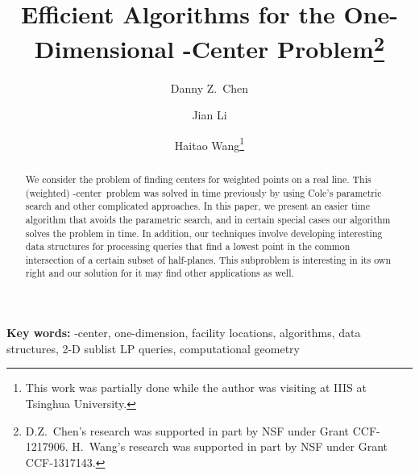 \documentclass{llncs}
\def\cen{-center}
\begin{document}
\title{Efficient Algorithms for the One-Dimensional -Center Problem\thanks{D.Z.~Chen's research was supported in part by NSF
under Grant CCF-1217906. H.~Wang's research was supported in part by NSF under Grant CCF-1317143.}}

\author{Danny Z.~Chen \and Jian Li
\and Haitao Wang\thanks{This work was partially done while the
author was visiting at IIIS at Tsinghua University.}}


\maketitle

\pagestyle{plain}
\setcounter{page}{1}


\begin{abstract}
We consider the problem of finding  centers for  weighted points on a real line.
This (weighted) \cen\ problem was solved in  time previously by using Cole's parametric search and other complicated approaches. In this paper, we present an easier  time algorithm that avoids the parametric search, and in certain special cases our algorithm solves the problem
in  time. In addition, our techniques involve developing interesting data structures for processing queries that find a
lowest point in the common intersection of a certain subset of half-planes. This subproblem is interesting in its own right and our solution for it may find other applications as well.
\end{abstract}

{\bf Key words:} -center, one-dimension, facility locations, algorithms, data structures, 2-D sublist LP queries, computational geometry
\end{document}
